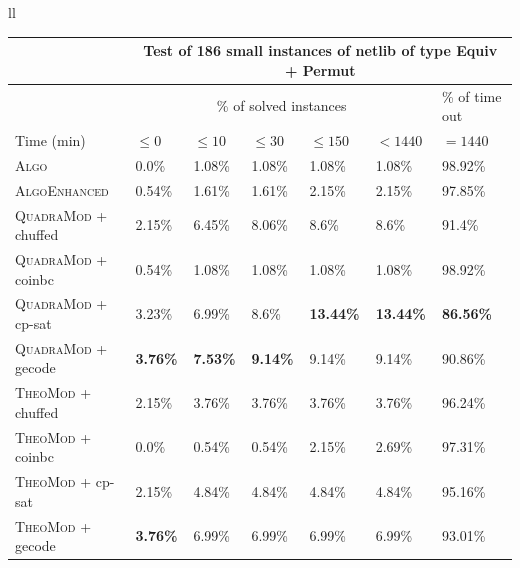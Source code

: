 \documentclass{book}
\begin{document}
\vspace{2cm}


\begin{tabular}{ll}

\hspace{0.5cm}
\begin{tabular}{|l|l|l|l|l|l|l|}\toprule & \multicolumn{6}{|c|}{Test of 186 small instances of netlib of type Equiv + Permut}\\\midrule
 & \multicolumn{5}{|c|}{\% of solved instances} & \% of time out\\
\midrule
 Time (min)  & $\leq 0$ & $\leq 10$ & $\leq 30$ & $\leq 150$ & $ < 1440$ & $= 1440$ \\
\midrule
\textsc{Algo}   & 0.0\% & 1.08\% & 1.08\% & 1.08\% & 1.08\% & 98.92\% \\
\textsc{AlgoEnhanced}   & 0.54\% & 1.61\% & 1.61\% & 2.15\% & 2.15\% & 97.85\% \\
\textsc{QuadraMod} + chuffed   & 2.15\% & 6.45\% & 8.06\% & 8.6\% & 8.6\% & 91.4\% \\
\textsc{QuadraMod} + coinbc   & 0.54\% & 1.08\% & 1.08\% & 1.08\% & 1.08\% & 98.92\% \\
\textsc{QuadraMod} + cp-sat   & 3.23\% & 6.99\% & 8.6\% & \bf 13.44\% & \bf 13.44\% &  \bf 86.56\% \\
\textsc{QuadraMod} + gecode   & \bf 3.76\% & \bf 7.53\% & \bf 9.14\% & 9.14\% & 9.14\% & 90.86\% \\
\textsc{TheoMod} + chuffed   & 2.15\% & 3.76\% & 3.76\% & 3.76\% & 3.76\% & 96.24\% \\
\textsc{TheoMod} + coinbc   & 0.0\% & 0.54\% & 0.54\% & 2.15\% & 2.69\% & 97.31\% \\
\textsc{TheoMod} + cp-sat   & 2.15\% & 4.84\% & 4.84\% & 4.84\% & 4.84\% & 95.16\% \\
\textsc{TheoMod} + gecode   & \bf 3.76\% & 6.99\% & 6.99\% & 6.99\% & 6.99\% & 93.01\% \\
\bottomrule\end{tabular} 


\end{tabular}
\end{document}
